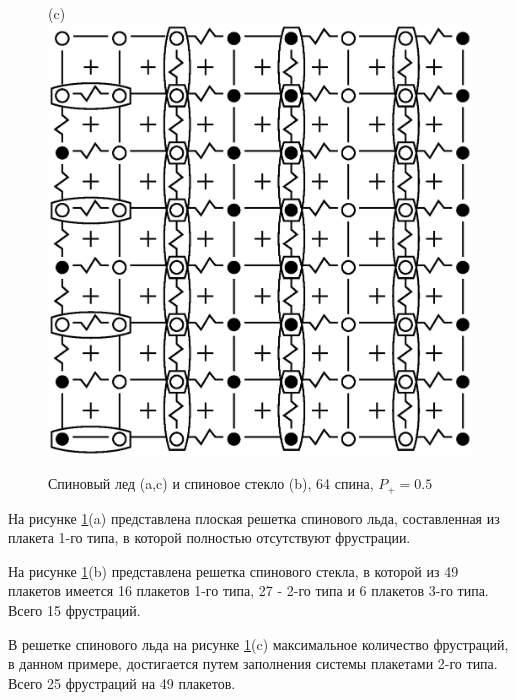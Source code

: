 \documentclass[utf8, babel, sor, jor, amsmath, amssymb, reprint]{elsarticle} %
\begin{document}
\begin{figure}[H]
\begin{minipage}[h]{0.3\linewidth}
	\end{minipage}
	\hfill
	\begin{minipage}[h]{0.3\linewidth}
		\centering(c)
		\includegraphics[width=1\linewidth]{pictures/SI_64_J0}
	\end{minipage}
	\hfill
	\caption{Спиновый лед (a,c) и спиновое стекло (b), 64 спина, $P_+ = 0.5$}
	\label{fig:cell_SI_SG_64}

\end{figure}


На рисунке \ref{fig:cell_SI_SG_64}(a) представлена плоская решетка спинового льда, составленная из плакета 1-го типа, в которой полностью отсутствуют фрустрации. 

На рисунке \ref{fig:cell_SI_SG_64}(b) представлена решетка спинового стекла, в которой из 49 плакетов имеется 16 плакетов 1-го типа, 27 - 2-го типа и 6 плакетов 3-го типа. Всего 15 фрустраций.

В решетке спинового льда на рисунке \ref{fig:cell_SI_SG_64}(c) максимальное количество фрустраций, в данном примере, достигается путем заполнения системы плакетами 2-го типа. Всего 25 фрустраций на 49 плакетов.
\end{document}
